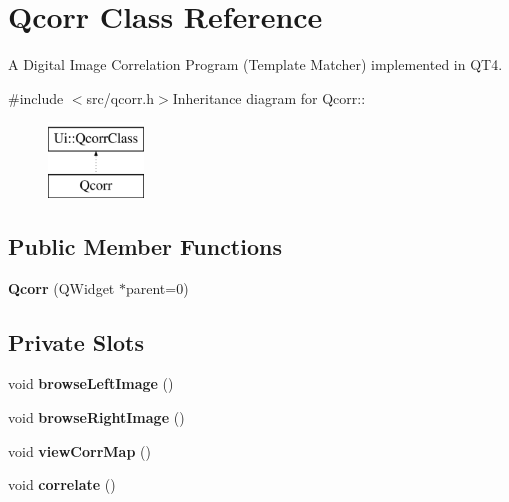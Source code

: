 \hypertarget{classQcorr}{
\section{Qcorr Class Reference}
\label{classQcorr}
}


A Digital Image Correlation Program (Template Matcher) implemented in QT4.  


{\ttfamily \#include $<$src/qcorr.h$>$}Inheritance diagram for Qcorr::\begin{figure}[H]
\begin{center}
\leavevmode
\includegraphics[height=2cm]{classQcorr}
\end{center}
\end{figure}
\subsection*{Public Member Functions}
\begin{DoxyCompactItemize}
\item 
\hypertarget{classQcorr_a3b5d03aed21bfd00497ff265d898e45b}{
{\bfseries Qcorr} (QWidget $\ast$parent=0)}
\label{classQcorr_a3b5d03aed21bfd00497ff265d898e45b}

\end{DoxyCompactItemize}
\subsection*{Private Slots}
\begin{DoxyCompactItemize}
\item 
\hypertarget{classQcorr_adb32e7bfe6afb84f306a9eb5bcd9b322}{
void {\bfseries browseLeftImage} ()}
\label{classQcorr_adb32e7bfe6afb84f306a9eb5bcd9b322}

\item 
\hypertarget{classQcorr_a60583105115d8d14c5fa2a959dc0f285}{
void {\bfseries browseRightImage} ()}
\label{classQcorr_a60583105115d8d14c5fa2a959dc0f285}

\item 
\hypertarget{classQcorr_aa038b382c62558414f6d4592cd039158}{
void {\bfseries viewCorrMap} ()}
\label{classQcorr_aa038b382c62558414f6d4592cd039158}

\item 
\hypertarget{classQcorr_ace91b9d83b34887735737323bac5431e}{
void {\bfseries correlate} ()}
\label{classQcorr_ace91b9d83b34887735737323bac5431e}

\end{DoxyCompactItemize}
